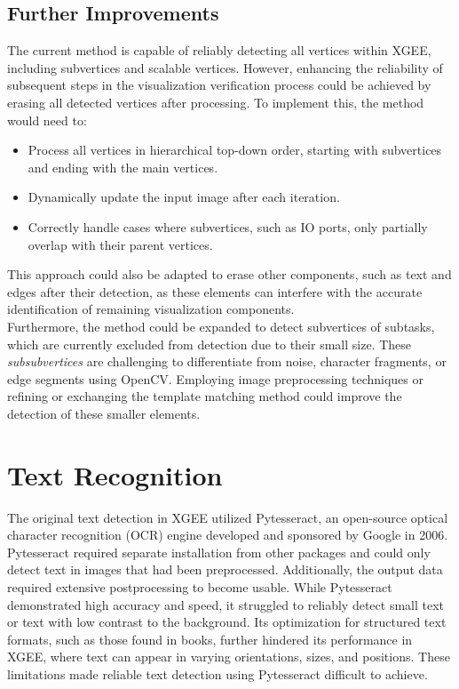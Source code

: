 \subsection{Further Improvements}
The current method is capable of reliably detecting all vertices within XGEE, including subvertices and scalable vertices. However, enhancing the reliability of subsequent steps in the visualization verification process could be achieved by erasing all detected vertices after processing. To implement this, the method would need to:
\begin{itemize}
    \item Process all vertices in hierarchical top-down order, starting with subvertices and ending with the main vertices.
    \item Dynamically update the input image after each iteration.
    \item Correctly handle cases where subvertices, such as IO ports, only partially overlap with their parent vertices.
\end{itemize}
This approach could also be adapted to erase other components, such as text and edges after their detection, as these elements can interfere with the accurate identification of remaining visualization components.\\
Furthermore, the method could be expanded to detect subvertices of subtasks, which are currently excluded from detection due to their small size. These \textit{subsubvertices} are challenging to differentiate from noise, character fragments, or edge segments using OpenCV. Employing image preprocessing techniques or refining or exchanging the template matching method could improve the detection of these smaller elements.

\section{Text Recognition}
\label{chp_text_recognition}
The original text detection in XGEE utilized Pytesseract, an open-source optical character recognition (OCR) engine developed and sponsored by Google in 2006. Pytesseract required separate installation from other packages and could only detect text in images that had been preprocessed. Additionally, the output data required extensive postprocessing to become usable. While Pytesseract demonstrated high accuracy and speed, it struggled to reliably detect small text or text with low contrast to the background. Its optimization for structured text formats, such as those found in books, further hindered its performance in XGEE, where text can appear in varying orientations, sizes, and positions. These limitations made reliable text detection using Pytesseract difficult to achieve.
